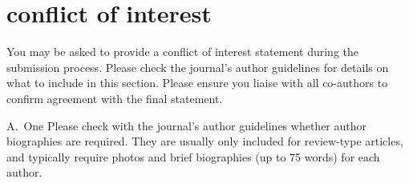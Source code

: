 \documentclass[num-refs]{wiley-article}
\begin{document}
\section*{conflict of interest}
You may be asked to provide a conflict of interest statement during the submission process. 
Please check the journal's author guidelines for details on what to include in this section. 
Please ensure you liaise with all co-authors to confirm agreement with the final statement.

\printendnotes



\begin{biography}{A.~One}
Please check with the journal's author guidelines whether author biographies are required. 
They are usually only included for review-type articles, and typically require photos and brief biographies (up to 75 words) for each author.
\bigskip
\bigskip
\end{biography}

\end{document}
